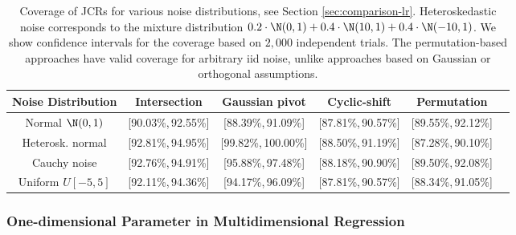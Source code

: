 \documentclass[english]{article}
\begin{document}
\begin{table}%
\centering
\begin{tabular}{ccccccc}
\toprule 
\multicolumn{2}{c}{Noise Distribution}& {Intersection}& {Gaussian pivot}  & {Cyclic-shift} & {Permutation}\\  %
\hline 
\multicolumn{2}{c}{Normal $\N(0,1)$}& [90.03\%,\,92.55\%]& [88.39\%,\,91.09\%]& [87.81\%,\,90.57\%] & [89.55\%,\,92.12\%]\\  
\multicolumn{2}{c}{Heterosk. normal}& [92.81\%,\,94.95\%]& [99.82\%,\,100.00\%]& [88.50\%,\,91.19\%] & [87.28\%,\,90.10\%]\\  
\multicolumn{2}{c}{Cauchy noise}
& 
[92.76\%,\,94.91\%]& [95.88\%,\,97.48\%]& [88.18\%,\,90.90\%] & [89.50\%,\,92.08\%]\\   
\multicolumn{2}{c}{Uniform $U[-5,5]$}& [92.11\%,\,94.36\%]& [94.17\%,\,96.09\%]& [87.81\%,\,90.57\%] & [88.34\%,\,91.05\%]\\  
\bottomrule
\end{tabular}
\caption{Coverage of JCRs for various noise distributions, see Section \ref{sec:comparison-lr}. 
Heteroskedastic noise corresponds to the mixture distribution $0.2\cdot \N(0,1)+0.4\cdot \N(10,1)+0.4\cdot \N(-10,1)$.
We show confidence intervals for the coverage based on $2,000$ independent trials. 
The permutation-based approaches have valid coverage for arbitrary iid noise, unlike approaches based on Gaussian or orthogonal assumptions.}
\label{table:compare-noise}
\end{table}




\iffalse
\subsubsection{One-dimensional Parameter in Multidimensional Regression}\label{sec:lr-high-d}
\end{document}
